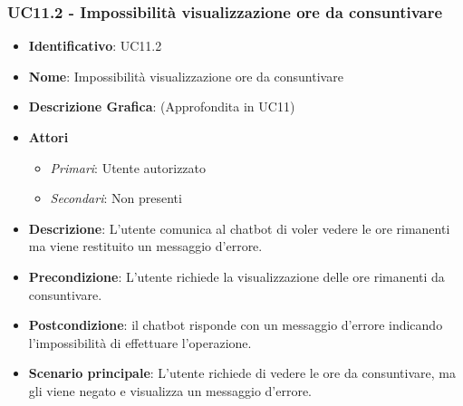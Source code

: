 \subsubsection{UC11.2 - Impossibilità visualizzazione ore da consuntivare}
\begin{itemize}
	\item \textbf{Identificativo}: UC11.2
	\item \textbf{Nome}: Impossibilità visualizzazione ore da consuntivare
	\item \textbf{Descrizione Grafica}: (Approfondita in UC11)
	\item \textbf{Attori}
	\begin{itemize} 
		\item \textit{Primari}: Utente autorizzato
		\item \textit{Secondari}: Non presenti
	\end{itemize}
	\item \textbf{Descrizione}: L'utente comunica al chatbot di voler vedere le ore rimanenti ma viene restituito un messaggio d'errore.
	\item \textbf{Precondizione}: L'utente richiede la visualizzazione delle ore rimanenti da consuntivare.
	\item \textbf{Postcondizione}: il chatbot risponde con un messaggio d'errore indicando l'impossibilità di effettuare l'operazione.
	\item \textbf{Scenario principale}: L'utente richiede di vedere le ore da consuntivare, ma gli viene negato e visualizza un messaggio d'errore.
\end{itemize}
\newpage